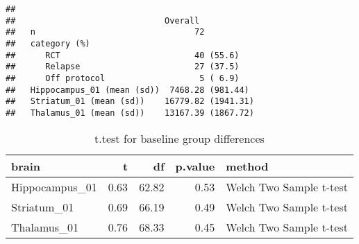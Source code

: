 \documentclass[]{article}
\newenvironment{Shaded}{\begin{snugshade}}{\end{snugshade}}
\newcommand{\KeywordTok}[1]{\textcolor[rgb]{0.13,0.29,0.53}{\textbf{#1}}}
\newcommand{\DataTypeTok}[1]{\textcolor[rgb]{0.13,0.29,0.53}{#1}}
\newcommand{\DecValTok}[1]{\textcolor[rgb]{0.00,0.00,0.81}{#1}}
\newcommand{\StringTok}[1]{\textcolor[rgb]{0.31,0.60,0.02}{#1}}
\newcommand{\OperatorTok}[1]{\textcolor[rgb]{0.81,0.36,0.00}{\textbf{#1}}}
\newcommand{\NormalTok}[1]{#1}
\theoremstyle{definition}
\theoremstyle{definition}
\theoremstyle{definition}
\theoremstyle{remark}
\begin{document}
\begin{verbatim}
##                             
##                              Overall           
##   n                                72          
##   category (%)                                 
##      RCT                           40 (55.6)   
##      Relapse                       27 (37.5)   
##      Off protocol                   5 ( 6.9)   
##   Hippocampus_01 (mean (sd))  7468.28 (981.44) 
##   Striatum_01 (mean (sd))    16779.82 (1941.31)
##   Thalamus_01 (mean (sd))    13167.39 (1867.72)
\end{verbatim}

\begin{Shaded}
\end{Shaded}

\begin{table}[t]

\caption{\label{tab:unnamed-chunk-5}t.test for baseline group differences}
\centering
\begin{tabular}{l|r|r|r|l}
\hline
brain & t & df & p.value & method\\
\hline
Hippocampus\_01 & 0.63 & 62.82 & 0.53 & Welch Two Sample t-test\\
\hline
Striatum\_01 & 0.69 & 66.19 & 0.49 & Welch Two Sample t-test\\
\hline
Thalamus\_01 & 0.76 & 68.33 & 0.45 & Welch Two Sample t-test\\
\hline
\end{tabular}
\end{table}
\end{document}
